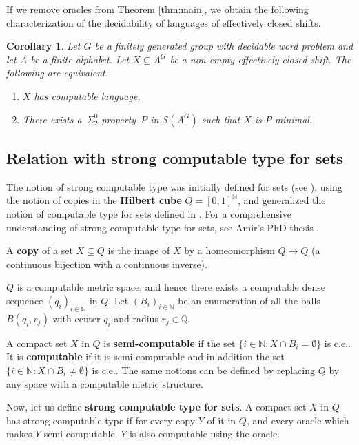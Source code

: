 \documentclass[french,american]{article}
\theoremstyle{plain}
\newtheorem{corollary}[theorem]{Corollary}
\theoremstyle{definition}
\theoremstyle{remark}
\theoremstyle{plain}
\begin{document}
If we remove oracles from Theorem \ref{thm:main}, we obtain
the following characterization of the decidability of languages of
effectively closed shifts.
\begin{corollary}
Let $G$ be a finitely generated group with decidable word problem
and let $A$ be a finite alphabet. Let $X\subseteq A^{G}$ be a non-empty
effectively closed shift. The following are equivalent.
\begin{enumerate}
\item $X$ has  computable language,
\item There exists a~$\Sigma_{2}^{0}$ property~$P$ in $\mathcal{S}(A^{G})$
such that $X$ is $P$-minimal.
\end{enumerate}
\end{corollary}


\subsection{Relation with strong computable type for sets}\label{subsec:SCTforsets}

The notion of strong computable type was initially defined for sets
(see \cite{AH22c}), using the notion of copies in the \textbf{Hilbert
cube} $Q=[0,1]^{\mathbb{N}}$, and generalized the notion of
computable type for sets defined in \cite{IljazovicS18}. For a comprehensive understanding of strong computable type for sets, see Amir's PhD thesis \cite{Phdamir2024}.

A \textbf{copy} of a set $X\subseteq Q$ is the image of $X$ by a
homeomorphism $Q\rightarrow Q$ (a continuous bijection with a continuous
inverse).

$Q$ is a computable metric space, and hence there exists a computable
dense sequence $(q_{i})_{i\in\mathbb{N}}$ in $Q$. Let $(B_{i})_{i\in\mathbb{\mathbb{N}}}$ be an enumeration of
all the balls $B(q_{i},r_{j})$ with center $q_{i}$ and radius $r_{j}\in\mathbb{Q}$.

A compact set $X$ in $Q$ is \textbf{semi-computable} if the set
$\{i\in\mathbb{N}:X\cap B_{i}=\emptyset\}$ is c.e.. It is \textbf{computable}
if it is semi-computable and in addition the set $\{i\in\mathbb{N}:X\cap B_{i}\neq\emptyset\}$
is c.e.. The same notions can be defined by replacing $Q$ by any
space with a computable metric structure.

Now, let us define \textbf{strong computable type for sets}. A compact
set $X$ in $Q$ has strong computable type if for every copy $Y$
of it in $Q$, and every oracle which makes $Y$ semi-computable,
$Y$ is also computable using the oracle.
\end{document}
